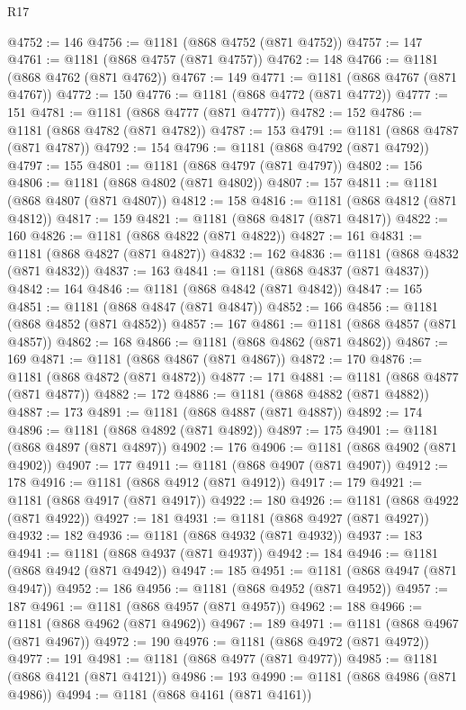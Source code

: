 \begin{lexlean}{R17}
\begin{coremodule}
@4752 := 146
@4756 := @1181 (@868 @4752 (@871 @4752))
@4757 := 147
@4761 := @1181 (@868 @4757 (@871 @4757))
@4762 := 148
@4766 := @1181 (@868 @4762 (@871 @4762))
@4767 := 149
@4771 := @1181 (@868 @4767 (@871 @4767))
@4772 := 150
@4776 := @1181 (@868 @4772 (@871 @4772))
@4777 := 151
@4781 := @1181 (@868 @4777 (@871 @4777))
@4782 := 152
@4786 := @1181 (@868 @4782 (@871 @4782))
@4787 := 153
@4791 := @1181 (@868 @4787 (@871 @4787))
@4792 := 154
@4796 := @1181 (@868 @4792 (@871 @4792))
@4797 := 155
@4801 := @1181 (@868 @4797 (@871 @4797))
@4802 := 156
@4806 := @1181 (@868 @4802 (@871 @4802))
@4807 := 157
@4811 := @1181 (@868 @4807 (@871 @4807))
@4812 := 158
@4816 := @1181 (@868 @4812 (@871 @4812))
@4817 := 159
@4821 := @1181 (@868 @4817 (@871 @4817))
@4822 := 160
@4826 := @1181 (@868 @4822 (@871 @4822))
@4827 := 161
@4831 := @1181 (@868 @4827 (@871 @4827))
@4832 := 162
@4836 := @1181 (@868 @4832 (@871 @4832))
@4837 := 163
@4841 := @1181 (@868 @4837 (@871 @4837))
@4842 := 164
@4846 := @1181 (@868 @4842 (@871 @4842))
@4847 := 165
@4851 := @1181 (@868 @4847 (@871 @4847))
@4852 := 166
@4856 := @1181 (@868 @4852 (@871 @4852))
@4857 := 167
@4861 := @1181 (@868 @4857 (@871 @4857))
@4862 := 168
@4866 := @1181 (@868 @4862 (@871 @4862))
@4867 := 169
@4871 := @1181 (@868 @4867 (@871 @4867))
@4872 := 170
@4876 := @1181 (@868 @4872 (@871 @4872))
@4877 := 171
@4881 := @1181 (@868 @4877 (@871 @4877))
@4882 := 172
@4886 := @1181 (@868 @4882 (@871 @4882))
@4887 := 173
@4891 := @1181 (@868 @4887 (@871 @4887))
@4892 := 174
@4896 := @1181 (@868 @4892 (@871 @4892))
@4897 := 175
@4901 := @1181 (@868 @4897 (@871 @4897))
@4902 := 176
@4906 := @1181 (@868 @4902 (@871 @4902))
@4907 := 177
@4911 := @1181 (@868 @4907 (@871 @4907))
@4912 := 178
@4916 := @1181 (@868 @4912 (@871 @4912))
@4917 := 179
@4921 := @1181 (@868 @4917 (@871 @4917))
@4922 := 180
@4926 := @1181 (@868 @4922 (@871 @4922))
@4927 := 181
@4931 := @1181 (@868 @4927 (@871 @4927))
@4932 := 182
@4936 := @1181 (@868 @4932 (@871 @4932))
@4937 := 183
@4941 := @1181 (@868 @4937 (@871 @4937))
@4942 := 184
@4946 := @1181 (@868 @4942 (@871 @4942))
@4947 := 185
@4951 := @1181 (@868 @4947 (@871 @4947))
@4952 := 186
@4956 := @1181 (@868 @4952 (@871 @4952))
@4957 := 187
@4961 := @1181 (@868 @4957 (@871 @4957))
@4962 := 188
@4966 := @1181 (@868 @4962 (@871 @4962))
@4967 := 189
@4971 := @1181 (@868 @4967 (@871 @4967))
@4972 := 190
@4976 := @1181 (@868 @4972 (@871 @4972))
@4977 := 191
@4981 := @1181 (@868 @4977 (@871 @4977))
@4985 := @1181 (@868 @4121 (@871 @4121))
@4986 := 193
@4990 := @1181 (@868 @4986 (@871 @4986))
@4994 := @1181 (@868 @4161 (@871 @4161))

\end{coremodule}
\end{lexlean}
